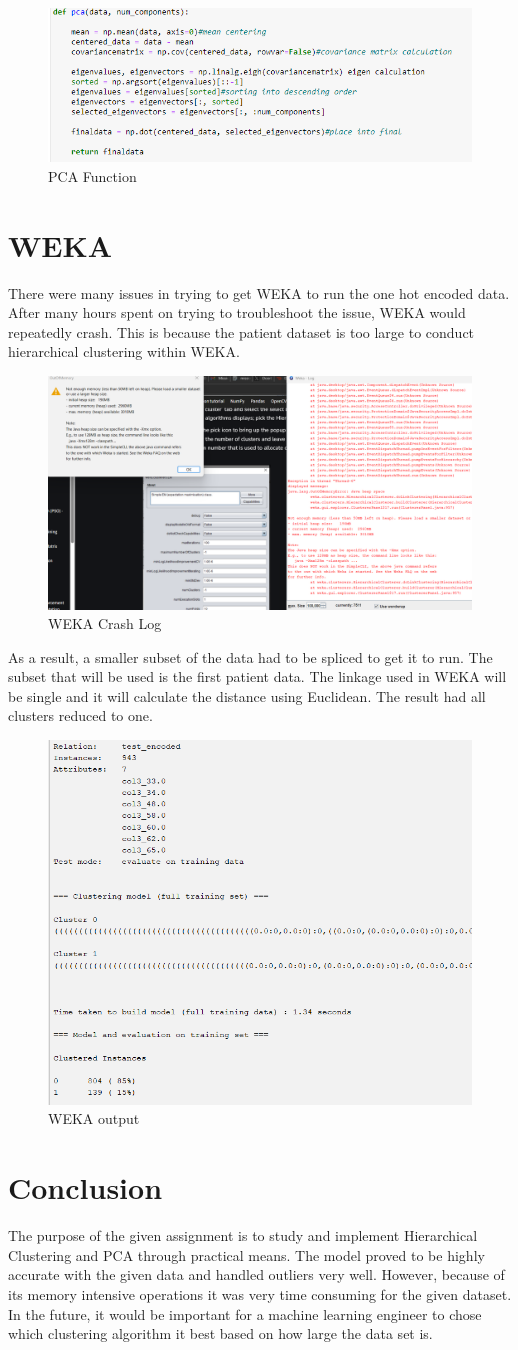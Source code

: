 \documentclass{article}
\begin{document}
\begin{figure}
    \centering
    \includegraphics[width=0.5\linewidth]{d.png}
    \caption{PCA Function}
    \label{fig:enter-label}
\end{figure}
\section{WEKA}
There were many issues in trying to get WEKA to run the one hot encoded data. After many hours spent on trying to troubleshoot the issue, WEKA would repeatedly crash. This is because the patient dataset is too large to conduct hierarchical clustering within WEKA. 
\begin{figure}
    \centering
    \includegraphics[width=0.5\linewidth]{e.png}
    \caption{WEKA Crash Log}
    \label{fig:enter-label}
\end{figure}
As a result, a smaller subset of the data had to be spliced to get it to run. The subset that will be used is the first patient data. The linkage used in WEKA will be single and it will calculate the distance using Euclidean. The result had all clusters reduced to one.
\begin{figure}
    \centering
    \includegraphics[width=0.5\linewidth]{f.png}
    \caption{WEKA output}
    \label{fig:enter-label}
\end{figure}
\section{Conclusion}
The purpose of the given assignment is to study and implement Hierarchical Clustering and PCA through practical means. The model proved to be highly accurate with the given data and handled outliers very well. However, because of its memory intensive operations it was very time consuming for the given dataset. In the future, it would be important for a machine learning engineer to chose which clustering algorithm it best based on how large the data set is.
\end{document}
